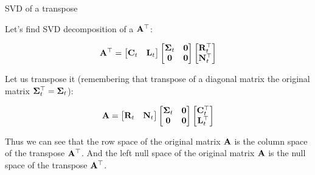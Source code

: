 \documentclass{beamer}
\begin{document}
\begin{frame}{SVD of a transpose}
	\begin{flushleft}
		
		Let's find SVD decomposition of a $\mathbf{A}^\top$:
		
		\begin{equation}
			\mathbf{A}^\top = 
			\begin{bmatrix}
				\mathbf{C}_t & \mathbf{L}_t
			\end{bmatrix}
			\begin{bmatrix}
				\mathbf{\Sigma}_t & \mathbf{0} \\
				\mathbf{0} & \mathbf{0}
			\end{bmatrix}
			\begin{bmatrix}
				\mathbf{R}_t^\top \\ \mathbf{N}_t^\top
			\end{bmatrix}
		\end{equation}
		
		Let us transpose it (remembering that transpose of a diagonal matrix the original matrix $\mathbf{\Sigma}_t^\top = \mathbf{\Sigma}_t$):
		
		
		\begin{equation}
			\mathbf{A} = 
			\begin{bmatrix}
				\mathbf{R}_t & \mathbf{N}_t
			\end{bmatrix}
			\begin{bmatrix}
				\mathbf{\Sigma}_t & \mathbf{0} \\
				\mathbf{0} & \mathbf{0}
			\end{bmatrix}
			\begin{bmatrix}
				\mathbf{C}_t^\top \\ \mathbf{L}_t^\top
			\end{bmatrix}
		\end{equation}
		
		Thus we can see that the row space of the original matrix $\mathbf{A}$ is the column space of the transpose $\mathbf{A}^\top$. And the left null space of the original matrix $\mathbf{A}$ is the null space of the transpose $\mathbf{A}^\top$.
		
		
	\end{flushleft}
\end{frame}
\end{document}
